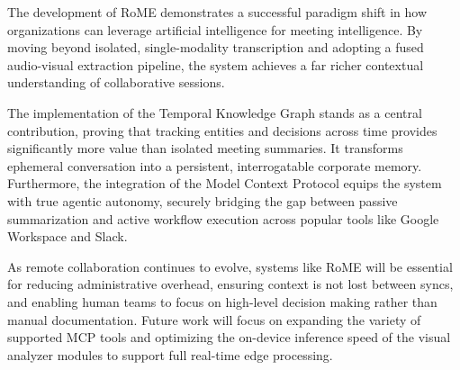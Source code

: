 The development of RoME demonstrates a successful paradigm shift in how organizations can leverage artificial intelligence for meeting intelligence. By moving beyond isolated, single-modality transcription and adopting a fused audio-visual extraction pipeline, the system achieves a far richer contextual understanding of collaborative sessions. 

The implementation of the Temporal Knowledge Graph stands as a central contribution, proving that tracking entities and decisions across time provides significantly more value than isolated meeting summaries. It transforms ephemeral conversation into a persistent, interrogatable corporate memory. Furthermore, the integration of the Model Context Protocol equips the system with true agentic autonomy, securely bridging the gap between passive summarization and active workflow execution across popular tools like Google Workspace and Slack.

As remote collaboration continues to evolve, systems like RoME will be essential for reducing administrative overhead, ensuring context is not lost between syncs, and enabling human teams to focus on high-level decision making rather than manual documentation. Future work will focus on expanding the variety of supported MCP tools and optimizing the on-device inference speed of the visual analyzer modules to support full real-time edge processing.
